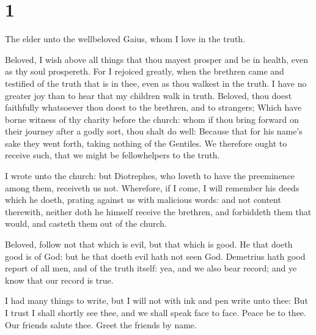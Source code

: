 \hypertarget{section}{%
\section{1}\label{section}}

 The elder unto the wellbeloved Gaius, whom I love in the
truth.

 Beloved, I wish above all things that thou mayest prosper
and be in health, even as thy soul prospereth.  For I
rejoiced greatly, when the brethren came and testified of the truth that
is in thee, even as thou walkest in the truth.  I have no
greater joy than to hear that my children walk in truth. 
Beloved, thou doest faithfully whatsoever thou doest to the brethren,
and to strangers;  Which have borne witness of thy charity
before the church: whom if thou bring forward on their journey after a
godly sort, thou shalt do well:  Because that for his
name's sake they went forth, taking nothing of the Gentiles.
 We therefore ought to receive such, that we might be
fellowhelpers to the truth.

 I wrote unto the church: but Diotrephes, who loveth to
have the preeminence among them, receiveth us not. 
Wherefore, if I come, I will remember his deeds which he doeth, prating
against us with malicious words: and not content therewith, neither doth
he himself receive the brethren, and forbiddeth them that would, and
casteth them out of the church.

 Beloved, follow not that which is evil, but that which
is good. He that doeth good is of God: but he that doeth evil hath not
seen God.  Demetrius hath good report of all men, and of
the truth itself: yea, and we also bear record; and ye know that our
record is true.

 I had many things to write, but I will not with ink and
pen write unto thee:  But I trust I shall shortly see
thee, and we shall speak face to face. Peace be to thee. Our friends
salute thee. Greet the friends by name.
